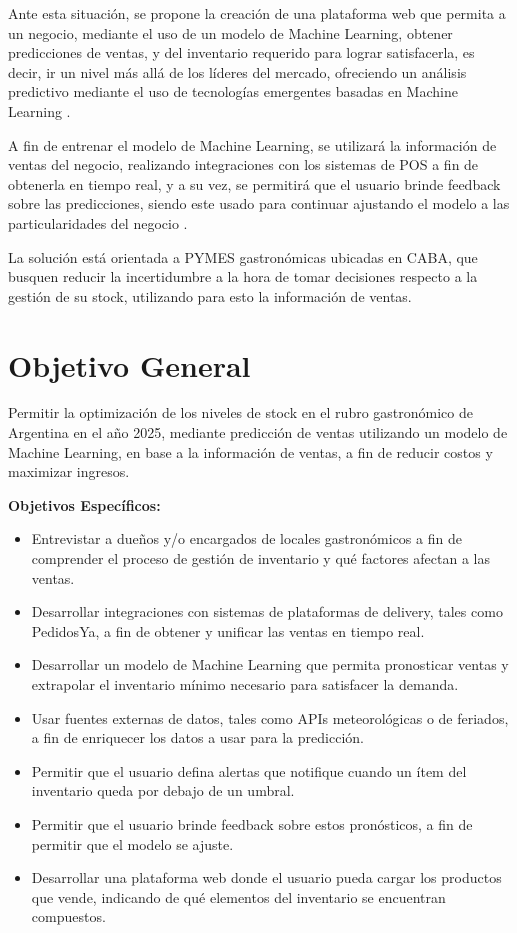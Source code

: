 Ante esta situación, se propone la creación de una plataforma web que permita a un negocio, mediante el uso de un modelo de Machine Learning, obtener predicciones de ventas, y del inventario requerido para lograr satisfacerla, es decir, ir un nivel más allá de los líderes del mercado, ofreciendo un análisis predictivo mediante el uso de tecnologías emergentes basadas en Machine Learning \parencite{posch2022bayesian}.

A fin de entrenar el modelo de Machine Learning, se utilizará la información de ventas del negocio, realizando integraciones con los sistemas de POS a fin de obtenerla en tiempo real, y a su vez, se permitirá que el usuario brinde feedback sobre las predicciones, siendo este usado para continuar ajustando el modelo a las particularidades del negocio \parencite{soto2024futuro}.

La solución está orientada a PYMES gastronómicas ubicadas en CABA, que busquen reducir la incertidumbre a la hora de tomar decisiones respecto a la gestión de su stock, utilizando para esto la información de ventas.

\section{Objetivo General}

Permitir la optimización de los niveles de stock en el rubro gastronómico de Argentina en el año 2025, mediante predicción de ventas utilizando un modelo de Machine Learning, en base a la información de ventas, a fin de reducir costos y maximizar ingresos.

\noindent\textbf{Objetivos Específicos:}

\begin{itemize}
    \item Entrevistar a dueños y/o encargados de locales gastronómicos a fin de comprender el proceso de gestión de inventario y qué factores afectan a las ventas.
    \item Desarrollar integraciones con sistemas de plataformas de delivery, tales como PedidosYa, a fin de obtener y unificar las ventas en tiempo real.
    \item Desarrollar un modelo de Machine Learning que permita pronosticar ventas y extrapolar el inventario mínimo necesario para satisfacer la demanda.
    \item Usar fuentes externas de datos, tales como APIs meteorológicas o de feriados, a fin de enriquecer los datos a usar para la predicción.
    \item Permitir que el usuario defina alertas que notifique cuando un ítem del inventario queda por debajo de un umbral.
    \item Permitir que el usuario brinde feedback sobre estos pronósticos, a fin de permitir que el modelo se ajuste.
    \item Desarrollar una plataforma web donde el usuario pueda cargar los productos que vende, indicando de qué elementos del inventario se encuentran compuestos.
\end{itemize}

